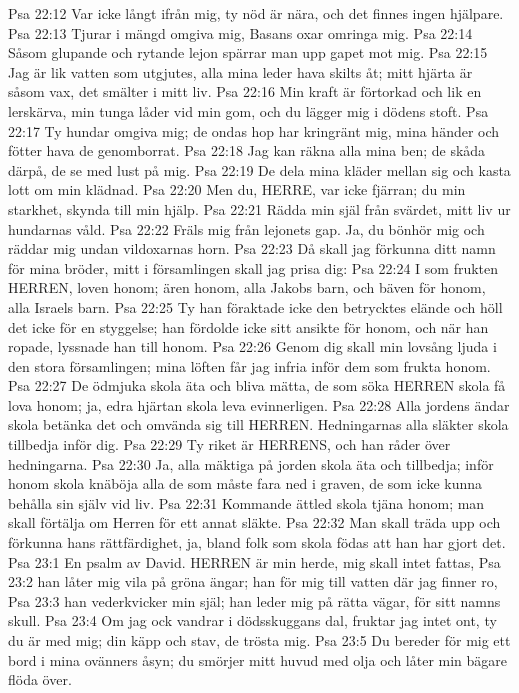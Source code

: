 Psa 22:12  Var icke långt ifrån mig, ty nöd är nära, och det finnes ingen hjälpare.
Psa 22:13  Tjurar i mängd omgiva mig, Basans oxar omringa mig.
Psa 22:14  Såsom glupande och rytande lejon spärrar man upp gapet mot mig.
Psa 22:15  Jag är lik vatten som utgjutes, alla mina leder hava skilts åt; mitt hjärta är såsom vax, det smälter i mitt liv.
Psa 22:16  Min kraft är förtorkad och lik en lerskärva, min tunga låder vid min gom, och du lägger mig i dödens stoft.
Psa 22:17  Ty hundar omgiva mig; de ondas hop har kringränt mig, mina händer och fötter hava de genomborrat.
Psa 22:18  Jag kan räkna alla mina ben; de skåda därpå, de se med lust på mig.
Psa 22:19  De dela mina kläder mellan sig och kasta lott om min klädnad.
Psa 22:20  Men du, HERRE, var icke fjärran; du min starkhet, skynda till min hjälp.
Psa 22:21  Rädda min själ från svärdet, mitt liv ur hundarnas våld.
Psa 22:22  Fräls mig från lejonets gap. Ja, du bönhör mig och räddar mig undan vildoxarnas horn.
Psa 22:23  Då skall jag förkunna ditt namn för mina bröder, mitt i församlingen skall jag prisa dig:
Psa 22:24  I som frukten HERREN, loven honom; ären honom, alla Jakobs barn, och bäven för honom, alla Israels barn.
Psa 22:25  Ty han föraktade icke den betrycktes elände och höll det icke för en styggelse; han fördolde icke sitt ansikte för honom, och när han ropade, lyssnade han till honom.
Psa 22:26  Genom dig skall min lovsång ljuda i den stora församlingen; mina löften får jag infria inför dem som frukta honom.
Psa 22:27  De ödmjuka skola äta och bliva mätta, de som söka HERREN skola få lova honom; ja, edra hjärtan skola leva evinnerligen.
Psa 22:28  Alla jordens ändar skola betänka det och omvända sig till HERREN. Hedningarnas alla släkter skola tillbedja inför dig.
Psa 22:29  Ty riket är HERRENS, och han råder över hedningarna.
Psa 22:30  Ja, alla mäktiga på jorden skola äta och tillbedja; inför honom skola knäböja alla de som måste fara ned i graven, de som icke kunna behålla sin själv vid liv.
Psa 22:31  Kommande ättled skola tjäna honom; man skall förtälja om Herren för ett annat släkte.
Psa 22:32  Man skall träda upp och förkunna hans rättfärdighet, ja, bland folk som skola födas att han har gjort det.
Psa 23:1  En psalm av David. HERREN är min herde, mig skall intet fattas,
Psa 23:2  han låter mig vila på gröna ängar; han för mig till vatten där jag finner ro,
Psa 23:3  han vederkvicker min själ; han leder mig på rätta vägar, för sitt namns skull.
Psa 23:4  Om jag ock vandrar i dödsskuggans dal, fruktar jag intet ont, ty du är med mig; din käpp och stav, de trösta mig.
Psa 23:5  Du bereder för mig ett bord i mina ovänners åsyn; du smörjer mitt huvud med olja och låter min bägare flöda över.
